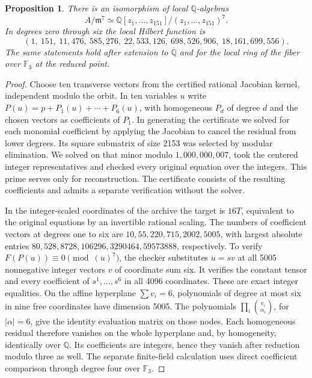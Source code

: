 \documentclass[11pt,reqno]{amsart}
\newcommand{\F}{\mathbb F}
\newcommand{\Q}{\mathbb Q}
\newtheorem{proposition}[theorem]{Proposition}
\begin{document}
\begin{proposition}\label{prop:jets}
There is an isomorphism of local \(\Q\)-algebras
\[
  A/\mathfrak m^7 \simeq
    \Q[z_1,\ldots,z_{151}]/(z_1,\ldots,z_{151})^7 .
\]
In degrees zero through six the local Hilbert function is
\[
             (1,\ 151,\ 11{,}476,\ 585{,}276,\ 22{,}533{,}126,\ 698{,}526{,}906,\ 18{,}161{,}699{,}556).
\]
The same statements hold after extension to \(\overline{\Q}\) and for the local ring of the fiber over \(\F_3\) at the reduced point.
\end{proposition}
\begin{proof}
Choose ten transverse vectors from the certified rational Jacobian kernel, independent modulo the orbit. In ten variables \(u\) write \(P(u)=p+P_1(u)+\cdots+P_6(u)\), with homogeneous \(P_d\) of degree \(d\) and the chosen vectors as coefficients of \(P_1\). In generating the certificate we solved for each monomial coefficient by applying the Jacobian to cancel the residual from lower degrees. Its square submatrix of size 2153 was selected by modular elimination. We solved on that minor modulo \(1{,}000{,}000{,}007\), took the centered integer representatives and checked every original equation over the integers. This prime serves only for reconstruction. The certificate consists of the resulting coefficients and admits a separate verification without the solver.

In the integer-scaled coordinates of the archive the target is \(16T\), equivalent to the original equations by an invertible rational scaling. The numbers of coefficient vectors at degrees one to six are \(10,55,220,715,2002,5005\), with largest absolute entries \(80,528,8728,106296,3290464,59573888\), respectively. To verify \(F(P(u))\equiv0\pmod{(u)^7}\), the checker substitutes \(u=sv\) at all 5005 nonnegative integer vectors \(v\) of coordinate sum six. It verifies the constant tensor and every coefficient of \(s^1,\ldots,s^6\) in all 4096 coordinates. These are exact integer equalities. On the affine hyperplane \(\sum v_i=6\), polynomials of degree at most six in nine free coordinates have dimension 5005. The polynomials \(\prod_i\binom{v_i}{\alpha_i}\), for \(|\alpha|=6\), give the identity evaluation matrix on those nodes. Each homogeneous residual therefore vanishes on the whole hyperplane and, by homogeneity, identically over \(\Q\). Its coefficients are integers, hence they vanish after reduction modulo three as well. The separate finite-field calculation uses direct coefficient comparison through degree four over \(\F_3\).


\end{proof}
\end{document}
